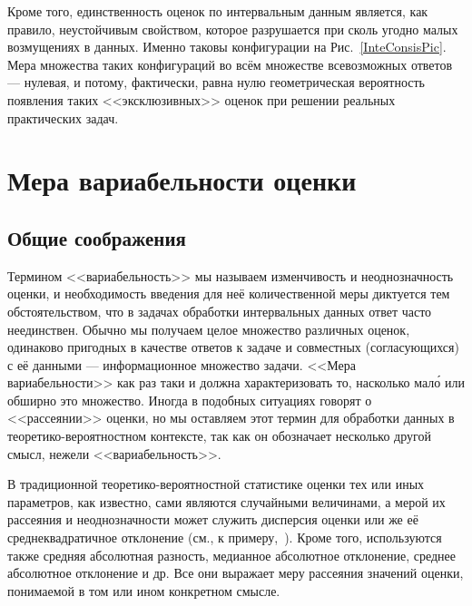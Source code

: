 \documentclass[a5paper,openany]{book}
\begin{document}
Кроме того, единственность оценок по интервальным данным является, как правило,
неустойчивым свойством, которое разрушается при сколь угодно малых возмущениях в данных. 
Именно таковы конфигурации на Рис.~\ref{InteConsisPic}. Мера множества таких конфигураций 
во всём множестве всевозможных ответов --- нулевая, и потому, фактически, равна нулю 
геометрическая вероятность появления таких <<эксклюзивных>> оценок при решении реальных 
практических задач. 
  
  
  
\section{Мера вариабельности оценки} 
\label{VariabilitySect}
  
  
\subsection{Общие соображения} 
\label{VariabIdeasSect}  
  
Термином <<вариабельность>> мы называем изменчивость и неоднозначность оценки, и 
необходимость введения для неё количественной меры диктуется тем обстоятельством, 
что в задачах обработки интервальных данных ответ часто неединствен. Обычно мы 
получаем целое множество различных оценок, одинаково пригодных в качестве ответов 
к задаче и совместных (согласующихся) с её данными --- информационное множество 
задачи. <<Мера вариабельности>> как раз таки и должна характеризовать то, насколько 
мал\'{о} или обширно это множество. Иногда в подобных ситуациях 
говорят о <<рассеянии>> оценки, но мы оставляем этот термин для обработки данных 
в теоретико-вероятностном контексте, так как он обозначает несколько другой смысл, 
нежели <<вариабельность>>.  
    
В традиционной теоретико-вероятностной статистике оценки тех или иных параметров,
как известно, сами являются случайными величинами, а мерой их рассеяния и 
неоднозначности может служить дисперсия оценки или же её среднеквадратичное 
отклонение (см., к примеру,~\cite{HCramer}). Кроме того, используются также 
средняя абсолютная разность, медианное абсолютное отклонение, среднее абсолютное 
отклонение и др. Все они выражает меру рассеяния значений оценки, понимаемой 
в том или ином конкретном смысле. 
  
\end{document}
